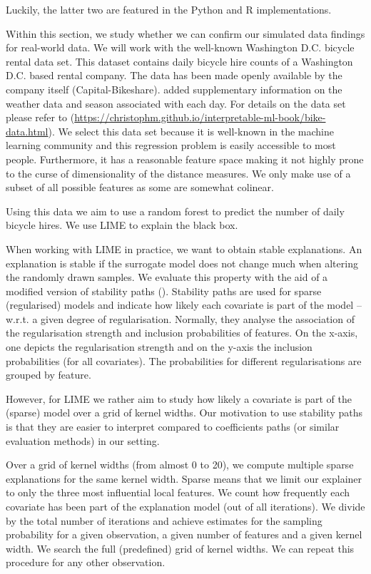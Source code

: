 \documentclass[
]{krantz}
\begin{document}
Luckily, the latter two are featured in the Python and R implementations.

Within this section, we study whether we can confirm our simulated data findings for real-world data.
We will work with the well-known Washington D.C. bicycle rental data set.
This dataset contains daily bicycle hire counts of a Washington D.C. based rental company. The data has been made openly available by the company itself (Capital-Bikeshare).
\citet{fanaee2014event} added supplementary information on the weather data and season associated with each day.
For details on the data set please refer to \citet{molnar2019} (\url{https://christophm.github.io/interpretable-ml-book/bike-data.html}).
We select this data set because it is well-known in the machine learning community and this regression problem is easily accessible to most people.
Furthermore, it has a reasonable feature space making it not highly prone to the curse of dimensionality of the distance measures.
We only make use of a subset of all possible features as some are somewhat colinear.

Using this data we aim to use a random forest to predict the number of daily bicycle hires.
We use LIME to explain the black box.

When working with LIME in practice, we want to obtain stable explanations.
An explanation is stable if the surrogate model does not change much when altering the randomly drawn samples.
We evaluate this property with the aid of a modified version of stability paths (\citet{meinshausen2010stability}).
Stability paths are used for sparse (regularised) models and indicate how likely each covariate is part of the model -- w.r.t. a given degree of regularisation.
Normally, they analyse the association of the regularisation strength and inclusion probabilities of features.
On the x-axis, one depicts the regularisation strength and on the y-axis the inclusion probabilities (for all covariates).
The probabilities for different regularisations are grouped by feature.

However, for LIME we rather aim to study how likely a covariate is part of the (sparse) model over a grid of kernel widths.
Our motivation to use stability paths is that they are easier to interpret compared to coefficients paths (or similar evaluation methods) in our setting.

Over a grid of kernel widths (from almost 0 to 20), we compute multiple sparse explanations for the same kernel width.
Sparse means that we limit our explainer to only the three most influential local features.
We count how frequently each covariate has been part of the explanation model (out of all iterations).
We divide by the total number of iterations and achieve estimates for the sampling probability for a given observation, a given number of features and a given kernel width.
We search the full (predefined) grid of kernel widths.
We can repeat this procedure for any other observation.
\end{document}
